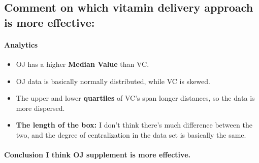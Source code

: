 \subsection{Comment on which vitamin delivery approach is more effective:}
\paragraph{\textbf{Analytics}}
\begin{itemize}
    \item OJ has a higher \textbf{Median Value} than VC.
    \item OJ data is basically normally distributed, while VC is skewed.
    \item The upper and lower \textbf{quartiles} of VC's span longer distances, so the data is more dispersed.
    \item \textbf{The length of the box:} I don't think there's much difference between the two, and the degree of centralization in the data set is basically the same.
\end{itemize}
\paragraph{\textbf{Conclusion} I think OJ supplement is more effective.}